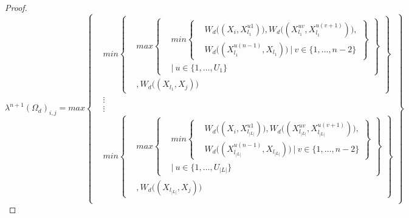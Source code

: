 \documentclass{article} %
\begin{document}
\begin{proof}
\[
\lambda^{n+1}(\Omega_d)_{i,j} =max
\left\{
  \begin{aligned}
    &min
      \left\{
      \begin{aligned}
        &max
          \left\{
          \begin{aligned}
            &min\left\{
            \begin{aligned}
            &W_d\big((X_i,X_{l_1}^{u1})\big), W_d\big((X_{l_1}^{uv},X_{l_1}^{u(v+1)})\big), \\
            &W_d\big((X_{l_1}^{u(n-1)},X_{l_1})\big)\ |\ v\in\{1,\ldots,n-2\}
            \end{aligned}
            \right\} \\
            &|\ u\in\{1,\ldots,U_1\}
          \end{aligned}
          \right\} \\
          &, W_d\big((X_{l_1},X_j)\big)
      \end{aligned}
      \right\} \\
      &\vdots \\
      &\vdots \\
    &min
      \left\{
      \begin{aligned}
        &max
          \left\{
          \begin{aligned}
            &min\left\{
            \begin{aligned}
            &W_d\big((X_i,X_{l_{|L|}}^{u1})\big), W_d\big((X_{l_{|L|}}^{uv},X_{l_{|L|}}^{u(v+1)})\big), \\
            &W_d\big((X_{l_{|L|}}^{u(n-1)},X_{l_{|L|}})\big)\ |\ v\in\{1,\ldots,n-2\}
            \end{aligned}
            \right\} \\
            &|\ u\in\{1,\ldots,U_{|L|}\}
          \end{aligned}
          \right\} \\
          &, W_d\big((X_{l_{|L|}},X_j)\big)
      \end{aligned}
      \right\} \\
  \end{aligned}
\right\}
\]


\end{proof}
\end{document}
